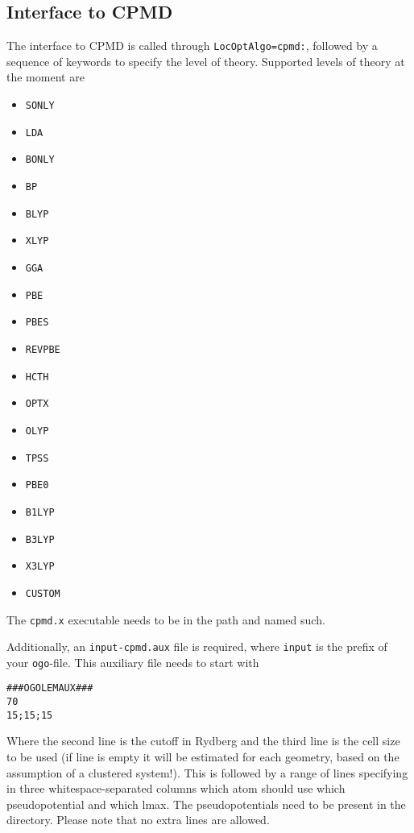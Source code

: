\documentclass[a4paper,10pt]{scrbook}
\begin{document}
\subsection{Interface to CPMD}
The interface to CPMD is called through \texttt{LocOptAlgo=cpmd:}, followed
by a sequence of keywords to specify the level of theory. Supported levels of
theory at the moment are
\begin{itemize}
  \item \texttt{SONLY}
  \item \texttt{LDA}
  \item \texttt{BONLY}
  \item \texttt{BP}
  \item \texttt{BLYP}
  \item \texttt{XLYP}
  \item \texttt{GGA}
  \item \texttt{PBE}
  \item \texttt{PBES}
  \item \texttt{REVPBE}
  \item \texttt{HCTH}
  \item \texttt{OPTX}
  \item \texttt{OLYP}
  \item \texttt{TPSS}
  \item \texttt{PBE0}
  \item \texttt{B1LYP}
  \item \texttt{B3LYP}
  \item \texttt{X3LYP}
  \item \texttt{CUSTOM}
\end{itemize}

The \texttt{cpmd.x} executable needs to be in the path and named such.

Additionally, an \texttt{input-cpmd.aux} file is required, where \texttt{input}
is the prefix of your \texttt{ogo}-file. This auxiliary file needs to start
with
\begin{verbatim}
###OGOLEMAUX###
70
15;15;15
\end{verbatim}
Where the second line is the cutoff in Rydberg and the third line is the cell
size to be used (if line is empty it will be estimated for each geometry, based
on the assumption of a clustered system!). This is followed by a range of lines
specifying in three whitespace-separated columns
which atom should use which pseudopotential and which lmax. The pseudopotentials
need to be present in the directory. Please note that no extra lines are
allowed.
\end{document}
